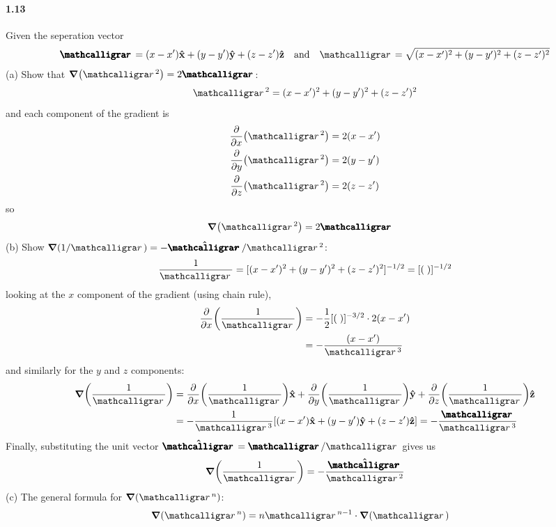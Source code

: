 \documentclass[../main.tex]{subfiles}
\begin{document}
\newpage
\paragraph{1.13}
Given the seperation vector
\begin{align*}
    \boldscriptr = (x - x') \vu{x} + (y - y') \vu{y} + (z - z') \vu{z} \qand 
    \scriptr = \sqrt{(x - x')^2 + (y - y')^2 + (z - z')^2}
\end{align*}
(a) Show that $\grad(\scriptr^2) = 2 \boldscriptr$:
\begin{align*}
    \scriptr^2 = (x - x')^2 + (y - y')^2 + (z - z')^2 
\end{align*}
and each component of the gradient is
\begin{align*}
    \pdv{x}(\scriptr^2) &= 2(x - x') \\
    \pdv{y}(\scriptr^2) &= 2(y - y') \\
    \pdv{z}(\scriptr^2) &= 2(z - z')
\end{align*}
so
\begin{align*}
    \grad(\scriptr^2) &= 2 \boldscriptr
\end{align*}
(b) Show $\grad(1/\scriptr) = -\vu*{\boldscriptr}/\scriptr^2$:
\begin{align*}
    \frac{1}{\scriptr} = [(x - x')^2 + (y - y')^2 + (z - z')^2]^{-1/2} = [(\;)]^{-1/2}
\end{align*}
looking at the $x$ component of the gradient (using chain rule),
\begin{align*}
    \pdv{x}(\frac{1}{\scriptr}) &= -\frac{1}{2} [(\;)]^{-3/2} \cdot 2(x - x') \\
    &= -\frac{(x - x')}{\scriptr^3}
\end{align*}
and similarly for the $y$ and $z$ components:
\begin{align*}
    \grad(\frac{1}{\scriptr}) &= \pdv{x}(\frac{1}{\scriptr}) \vu{x}
        + \pdv{y}(\frac{1}{\scriptr}) \vu{y} + \pdv{z}(\frac{1}{\scriptr}) \vu{z} \\
    &= -\frac{1}{\scriptr^3}
        [(x - x') \vu{x} + (y - y') \vu{y} + (z - z') \vu{z}]
    = -\frac{\boldscriptr}{\scriptr^3}
\end{align*}
Finally, substituting the unit vector $\vu{\boldscriptr} = \boldscriptr/\scriptr$ gives us
\begin{align*}
    \grad(\frac{1}{\scriptr}) = -\frac{\vu*{\boldscriptr}}{\scriptr^2}
\end{align*}
(c) The general formula for $\grad(\scriptr^n)$:
\begin{align*}
    \grad(\scriptr^n) &=
    n \scriptr^{n-1} \cdot \grad{(\scriptr)}
\end{align*}
\end{document}
